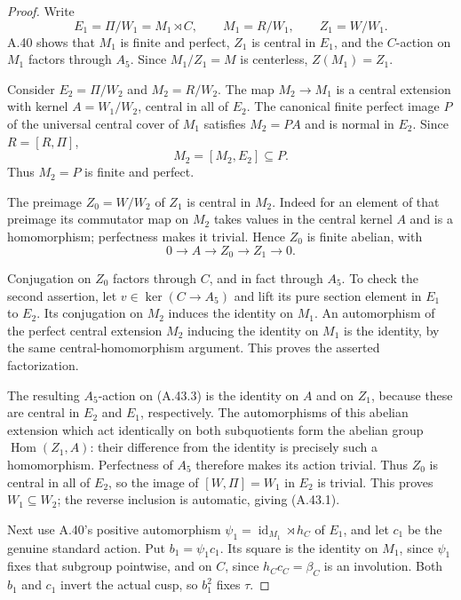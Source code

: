 \begin{proof}
Write
\[
 E_1=\Pi/W_1=M_1\rtimes C,
 \qquad M_1=R/W_1,\qquad Z_1=W/W_1.
\]
A.40 shows that \(M_1\) is finite and perfect,
\(Z_1\) is central in \(E_1\), and the
\(C\)-action on \(M_1\) factors through
\(A_5\). Since \(M_1/Z_1=M\) is centerless,
\(Z(M_1)=Z_1\).

Consider \(E_2=\Pi/W_2\) and \(M_2=R/W_2\).
The map \(M_2\to M_1\) is a central extension
with kernel \(A=W_1/W_2\), central in all of
\(E_2\). The canonical finite perfect image
\(P\) of the universal central cover of
\(M_1\) satisfies \(M_2=PA\) and is normal
in \(E_2\). Since \(R=[R,\Pi]\),
\[
                  M_2=[M_2,E_2]\subseteq P.
\]
Thus \(M_2=P\) is finite and perfect.

The preimage \(Z_0=W/W_2\) of \(Z_1\) is
central in \(M_2\). Indeed for an element of
that preimage its commutator map on \(M_2\)
takes values in the central kernel \(A\)
and is a homomorphism; perfectness makes it
trivial. Hence \(Z_0\) is finite abelian, with
\[
                    0\longrightarrow A\longrightarrow Z_0
                         \longrightarrow Z_1\longrightarrow0.
 \tag{A.43.3}
\]

Conjugation on \(Z_0\) factors through \(C\),
and in fact through \(A_5\). To check the
second assertion, let \(v\in\ker(C\to A_5)\)
and lift its pure section element in \(E_1\)
to \(E_2\). Its conjugation on \(M_2\)
induces the identity on \(M_1\). An
automorphism of the perfect central extension
\(M_2\) inducing the identity on \(M_1\)
is the identity, by the same central-homomorphism
argument. This proves the asserted factorization.

The resulting \(A_5\)-action on (A.43.3)
is the identity on \(A\) and on \(Z_1\),
because these are central in \(E_2\) and
\(E_1\), respectively. The automorphisms of
this abelian extension which act identically
on both subquotients form the abelian group
\(\operatorname{Hom}(Z_1,A)\): their difference
from the identity is precisely such a homomorphism.
Perfectness of \(A_5\) therefore makes its
action trivial. Thus \(Z_0\) is central in
all of \(E_2\), so the image of
\([W,\Pi]=W_1\) in \(E_2\) is trivial.
This proves \(W_1\subseteq W_2\); the reverse
inclusion is automatic, giving (A.43.1).

Next use A.40's positive automorphism
\(\psi_1=\operatorname{id}_{M_1}\rtimes h_C\)
of \(E_1\), and let \(c_1\) be the genuine
standard action. Put \(b_1=\psi_1c_1\).
Its square is the identity on \(M_1\), since
\(\psi_1\) fixes that subgroup pointwise, and
on \(C\), since \(h_Cc_C=\beta_C\) is an
involution. Both \(b_1\) and \(c_1\) invert
the actual cusp, so \(b_1^2\) fixes \(\tau\).


\end{proof}
